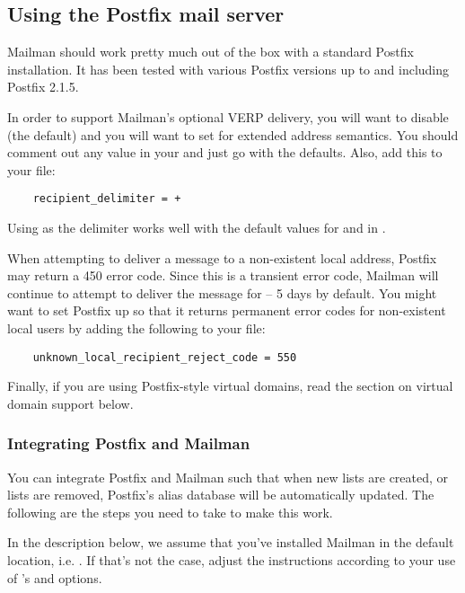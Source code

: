 \documentclass{howto}
\begin{document}
\subsection{Using the Postfix mail server}

Mailman should work pretty much out of the box with a standard Postfix
installation.  It has been tested with various Postfix versions up to and
including Postfix 2.1.5.

In order to support Mailman's optional VERP delivery, you will want to disable
 (the default) and you will want to set
 for extended address semantics.  You should comment
out any  value in your  and just go with the
defaults.  Also, add this to your  file:

\begin{verbatim}
    recipient_delimiter = +
\end{verbatim}

Using \samp{+} as the delimiter works well with the default values for
 and  in .

When attempting to deliver a message to a non-existent local address, Postfix
may return a 450 error code.  Since this is a transient error code, Mailman
will continue to attempt to deliver the message for
 -- 5 days by default.  You might want to set
Postfix up so that it returns permanent error codes for non-existent local
users by adding the following to your  file:

\begin{verbatim}
    unknown_local_recipient_reject_code = 550
\end{verbatim}

Finally, if you are using Postfix-style virtual domains, read the section on
virtual domain support below.

\subsubsection{Integrating Postfix and Mailman}

You can integrate Postfix and Mailman such that when new lists are created, or
lists are removed, Postfix's alias database will be automatically updated.
The following are the steps you need to take to make this work.

In the description below, we assume that you've installed Mailman in the
default location, i.e. .  If that's not the case,
adjust the instructions according to your use of 's
 and  options.
\end{document}
